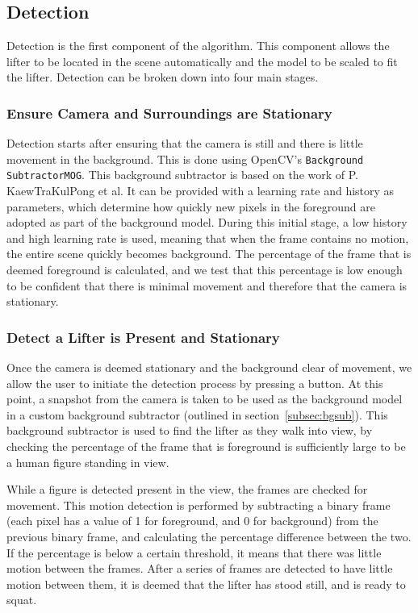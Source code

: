\subsection{Detection}

Detection is the first component of the algorithm. This component allows the lifter to be located in the scene automatically and the model to be scaled to fit the lifter. Detection can be broken down into four main stages.

\subsubsection{Ensure Camera and Surroundings are Stationary}
Detection starts after ensuring that the camera is still and there is little movement in the background. This is done using OpenCV's \texttt{Background SubtractorMOG}. This background subtractor is based on the work of P. KaewTraKulPong et al\cite{backgroundsubmog}. It can be provided with a learning rate and history as parameters, which determine how quickly new pixels in the foreground are adopted as part of the background model. During this initial stage, a low history and high learning rate is used, meaning that when the frame contains no motion, the entire scene quickly becomes background. The percentage of the frame that is deemed foreground is calculated, and we test that this percentage is low enough to be confident that there is minimal movement and therefore that the camera is stationary.

\subsubsection{Detect a Lifter is Present and Stationary}
Once the camera is deemed stationary and the background clear of movement, we allow the user to initiate the detection process by pressing a button. At this point, a snapshot from the camera is taken to be used as the background model in a custom background subtractor (outlined in section~\ref{subsec:bgsub}). This background subtractor is used to find the lifter as they walk into view, by checking the percentage of the frame that is foreground is sufficiently large to be a human figure standing in view. 

While a figure is detected present in the view, the frames are checked for movement. This motion detection is performed by subtracting a binary frame (each pixel has a value of 1 for foreground, and 0 for background) from the previous binary frame, and calculating the percentage difference between the two. If the percentage is below a certain threshold, it means that there was little motion between the frames. After a series of frames are detected to have little motion between them, it is deemed that the lifter has stood still, and is ready to squat.


